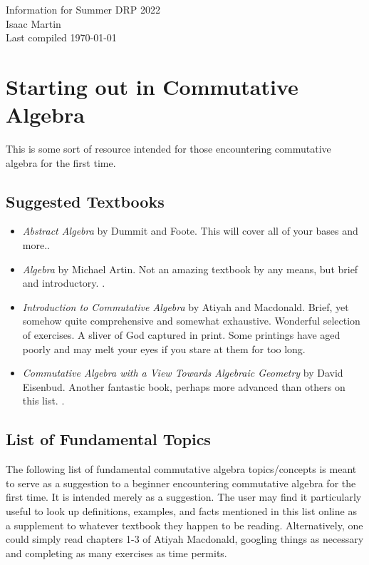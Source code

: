 


\pagestyle{empty}
	\LARGE
\begin{center}
	Information for Summer DRP 2022\\
	\Large
	Isaac Martin \\
    Last compiled \today
\end{center}
\normalsize
\vspace{-2mm}
\hru
\tableofcontents
\newpage
\section{Starting out in Commutative Algebra}
This is some sort of resource intended for those encountering commutative algebra for the first time.
\subsection{Suggested Textbooks}
\begin{itemize}
	\item \emph{Abstract Algebra} by Dummit and Foote. This will cover all of your bases and more.\cite{dummit-foote}.
	\item \emph{Algebra} by Michael Artin. Not an amazing textbook by any means, but brief and introductory. \cite{artin-algebra}.
	\item \emph{Introduction to Commutative Algebra} by Atiyah and Macdonald. Brief, yet somehow quite comprehensive and somewhat exhaustive. Wonderful selection of exercises. A sliver of God captured in print. Some printings have aged poorly and may melt your eyes if you stare at them for too long. \cite{am}
	\item \emph{Commutative Algebra with a View Towards Algebraic Geometry} by David Eisenbud. Another fantastic book, perhaps more advanced than others on this list. \cite{eisenbud-com-alg}.
\end{itemize}

\subsection{List of Fundamental Topics}

The following list of fundamental commutative algebra topics/concepts is meant to serve as a suggestion to a beginner encountering commutative algebra for the first time. It is intended merely as a suggestion. The user may find it particularly useful to look up definitions, examples, and facts mentioned in this list online as a supplement to whatever textbook they happen to be reading. Alternatively, one could simply read chapters 1-3 of Atiyah Macdonald, googling things as necessary and completing as many exercises as time permits.

